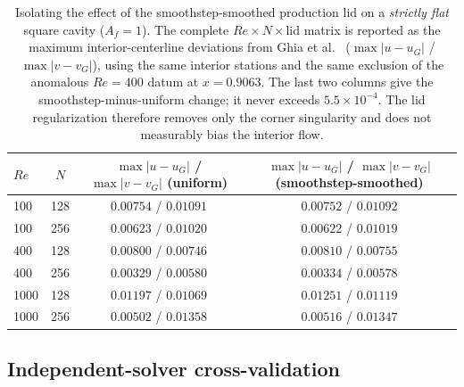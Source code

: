 \begin{table}[!htbp]
\centering
\caption{Isolating the effect of the smoothstep-smoothed production lid on a \emph{strictly flat} square cavity ($A_f=1$). The complete $Re\times N\times$lid matrix is reported as the maximum interior-centerline deviations from Ghia et al.~\cite{Ghia1982} ($\max|u-u_G|$ / $\max|v-v_G|$), using the same interior stations and the same exclusion of the anomalous $Re=400$ datum at $x=0.9063$. The last two columns give the smoothstep-minus-uniform change; it never exceeds $5.5\times10^{-4}$. The lid regularization therefore removes only the corner singularity and does not measurably bias the interior flow.}
\label{supptab:lidreg}
\begin{tabular}{@{}lccc@{}}
\hline
$Re$ & $N$ & $\max|u-u_G|$ / $\max|v-v_G|$ (uniform) & $\max|u-u_G|$ / $\max|v-v_G|$ (smoothstep-smoothed) \\
\hline
100  & 128 & $0.00754$ / $0.01091$ & $0.00752$ / $0.01092$ \\
100  & 256 & $0.00623$ / $0.01020$ & $0.00622$ / $0.01019$ \\
400  & 128 & $0.00800$ / $0.00746$ & $0.00810$ / $0.00755$ \\
400  & 256 & $0.00329$ / $0.00580$ & $0.00334$ / $0.00578$ \\
1000 & 128 & $0.01197$ / $0.01069$ & $0.01251$ / $0.01119$ \\
1000 & 256 & $0.00502$ / $0.01358$ & $0.00516$ / $0.01347$ \\
\hline
\end{tabular}
\end{table}

\subsection{Independent-solver cross-validation}
\label{suppsec:crosscheck}

